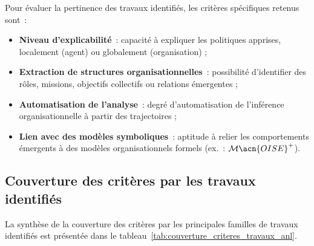 Pour évaluer la pertinence des travaux identifiés, les critères spécifiques retenus sont~:
\begin{itemize}
  \item \textbf{Niveau d’explicabilité}~: capacité à expliquer les politiques apprises, localement (agent) ou globalement (organisation) ;
  \item \textbf{Extraction de structures organisationnelles}~: possibilité d’identifier des rôles, missions, objectifs collectifs ou relations émergentes ;
  \item \textbf{Automatisation de l’analyse}~: degré d’automatisation de l’inférence organisationnelle à partir des trajectoires ;
  \item \textbf{Lien avec des modèles symboliques}~: aptitude à relier les comportements émergents à des modèles organisationnels formels (ex.~: $\mathcal{M}\acn{OISE}^+$).
\end{itemize}

\subsection*{Couverture des critères par les travaux identifiés}

La synthèse de la couverture des critères par les principales familles de travaux identifiés est présentée dans le tableau~\ref{tab:couverture_criteres_travaux_anl}.

